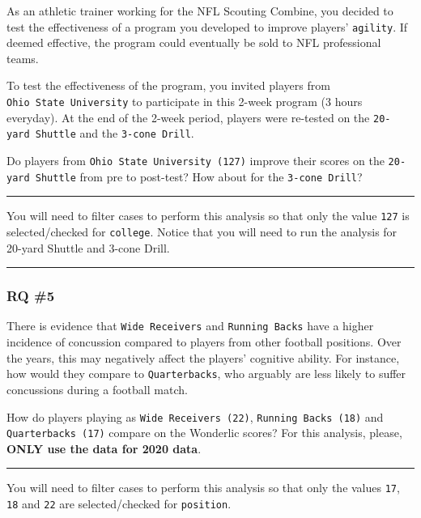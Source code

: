 \documentclass[
]{article}
\begin{document}
As an athletic trainer working for the NFL Scouting Combine, you decided to test the effectiveness of a program you developed to improve players' \texttt{agility}. If deemed effective, the program could eventually be sold to NFL professional teams.

To test the effectiveness of the program, you invited players from \texttt{Ohio\ State\ University} to participate in this 2-week program (3 hours everyday). At the end of the 2-week period, players were re-tested on the \texttt{20-yard\ Shuttle} and the \texttt{3-cone\ Drill}.

Do players from \texttt{Ohio\ State\ University\ (127)} improve their scores on the \texttt{20-yard\ Shuttle} from pre to post-test? How about for the \texttt{3-cone\ Drill}?

\begin{center}\rule{0.5\linewidth}{0.5pt}\end{center}

You will need to filter cases to perform this analysis so that only the value \texttt{127} is selected/checked for \texttt{college}. Notice that you will need to run the analysis for 20-yard Shuttle and 3-cone Drill.

\begin{center}\rule{0.5\linewidth}{0.5pt}\end{center}

\hypertarget{rq-5}{%
\subsubsection{RQ \#5}\label{rq-5}}

There is evidence that \texttt{Wide\ Receivers} and \texttt{Running\ Backs} have a higher incidence of concussion compared to players from other football positions. Over the years, this may negatively affect the players' cognitive ability. For instance, how would they compare to \texttt{Quarterbacks}, who arguably are less likely to suffer concussions during a football match.

How do players playing as \texttt{Wide\ Receivers\ (22)}, \texttt{Running\ Backs\ (18)} and \texttt{Quarterbacks\ (17)} compare on the Wonderlic scores? For this analysis, please, \textbf{ONLY use the data for 2020 data}.

\begin{center}\rule{0.5\linewidth}{0.5pt}\end{center}

You will need to filter cases to perform this analysis so that only the values \texttt{17}, \texttt{18} and \texttt{22} are selected/checked for \texttt{position}.
\end{document}
